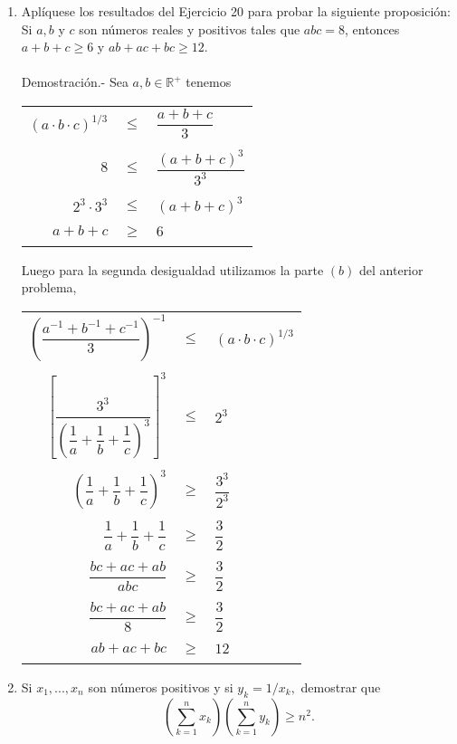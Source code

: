 \begin{enumerate}
\item Aplíquese los resultados del Ejercicio 20 para probar la siguiente proposición: Si $a,b$ y $c$ son números reales y positivos tales que $abc=8$, entonces $a+b+c \geq 6$ y $ab +ac +bc \geq 12.$\\\\
Demostración.- \; Sea $a,b \in \mathbb{R}^+$ tenemos 
\begin{center}
\begin{tabular}{rcl}
$(a\cdot b \cdot c)^{1/3}$&$\leq$&$ \dfrac{a+b+c}{3} $\\\\
$8$&$\leq$&$\dfrac{(a+b+c)^3}{3^3}$\\\\
$2^3 \cdot 3^3$&$\leq$&$(a+b+c)^3$\\\\
$a+b+c$&$\geq$&$6$\\\\
\end{tabular}
\end{center}
Luego para la segunda desigualdad utilizamos la parte $(b)$ del anterior problema,
\begin{center}
\begin{tabular}{rcl}
$\left( \dfrac{a^{-1} + b^{-1} + c^{-1}}{3} \right)^{-1}$&$\leq$&$(a \cdot b \cdot c)^{1/3}$\\\\
$\left[ \dfrac{3^3}{\left( \dfrac{1}{a} + \dfrac{1}{b} + \dfrac{1}{c} \right)^3} \right] ^3$&$\leq$&$2^3$\\\\
$\left( \dfrac{1}{a} + \dfrac{1}{b} + \dfrac{1}{c} \right)^3$&$\geq $&$\dfrac{3^3}{2^3}$\\\\
$\dfrac{1}{a} + \dfrac{1}{b} + \dfrac{1}{c}$&$\geq$&$\dfrac{3}{2}$\\\\
$\dfrac{bc + ac + ab}{abc}$&$\geq$&$\dfrac{3}{2}$\\\\
$\dfrac{bc + ac + ab}{8}$&$\geq$&$\dfrac{3}{2}$\\\\
$ab+ac+bc$&$\geq$&$12$\\\\
\end{tabular}
\end{center}
\item Si $x_1,...,x_n$ son números positivos y si $y_k = 1/x_k,$ demostrar que $$\displaystyle \left( \sum_{k=1}^n x_k \right) \left( \sum_{k=1}^n y_k \right) \geq n^2.$$\\\\

\end{enumerate}
